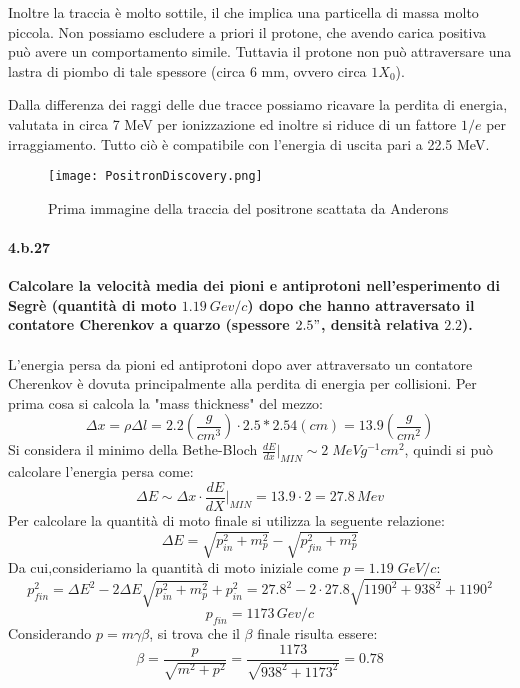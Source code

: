 \documentclass[twoside]{article}
\begin{document}
Inoltre la traccia è molto sottile, il che implica una particella di massa molto piccola. Non possiamo escludere a priori il protone, che avendo carica positiva può avere un comportamento simile. Tuttavia il protone non può attraversare una lastra di piombo di tale spessore (circa 6 mm, ovvero circa $1X_0$).

Dalla differenza dei raggi delle due tracce possiamo ricavare la perdita di energia, valutata in circa 7 MeV per ionizzazione ed inoltre si riduce di un fattore $1/e$ per irraggiamento. Tutto ciò è compatibile con l'energia di uscita pari a 22.5 MeV. 

\begin{figure}[H]
    \centering
    \texttt{[image: PositronDiscovery.png]}
    \caption{Prima immagine della traccia del positrone scattata da Anderons}
    \label{fig:positron}
\end{figure}


\paragraph{4.b.27}\textbf{Calcolare la velocità media dei pioni e antiprotoni nell'esperimento di Segrè (quantità di moto $1.19\ Gev/c$) dopo che hanno attraversato il contatore Cherenkov a quarzo (spessore $2.5"$, densità relativa $2.2$).}\\
\\
L'energia persa da pioni ed antiprotoni dopo aver attraversato un contatore Cherenkov è dovuta principalmente alla perdita di energia per collisioni.
Per prima cosa si calcola la "mass thickness" del mezzo:
\begin{equation}
    \Delta x= \rho \Delta l= 2.2 (\frac{g}{cm^3}) \cdot 2.5 * 2.54 (cm)= 13.9 (\frac{g}{cm^2})
\end{equation}
Si considera il minimo della Bethe-Bloch $\frac{dE}{dx}\biggr|_{MIN}\sim 2 \; MeV g^{-1} cm^2$, quindi si può calcolare l'energia persa come:
\begin{equation}
    \Delta E \sim \Delta x\cdot \frac{dE}{dX}\Biggr|_{MIN}=13.9\cdot 2=27.8\, Mev
\end{equation}
Per calcolare la quantità di moto finale si utilizza la seguente relazione:
\begin{equation}
   \Delta E= \sqrt{p_{in}^2+m_p^2}-\sqrt{p_{fin}^2+m_p^2}
\end{equation}
Da cui,consideriamo la quantità di moto iniziale come $p=1.19\; GeV/c$:
\begin{equation}
    p_{fin}^2=\Delta E^2-2\Delta E\sqrt{p_{in}^2+m_p^2} + p_{in}^2=  27.8^2-2\cdot27.8\sqrt{1190^2+938^2}+1190^2
\end{equation}
\begin{equation}
    p_{fin}=1173\, Gev/c
\end{equation}
Considerando $p=m\gamma \beta$, si trova che il $\beta$ finale risulta essere:
\begin{equation}
    \beta=\frac{p}{\sqrt{m^2+p^2}} =\frac{1173}{\sqrt{938^2+1173^2}}=0.78
\end{equation}
\end{document}
